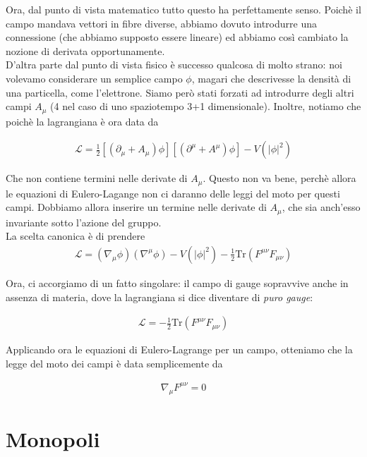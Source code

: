 \documentclass{report}
\begin{document}
Ora, dal punto di vista matematico tutto questo ha perfettamente senso. Poichè il campo mandava vettori in fibre diverse, abbiamo dovuto introdurre una connessione (che abbiamo supposto essere lineare) ed abbiamo così cambiato la nozione di derivata opportunamente. \\

D'altra parte dal punto di vista fisico è successo qualcosa di molto strano: noi volevamo considerare un semplice campo \(\phi\), magari che descrivesse la densità di una particella, come l'elettrone. Siamo però stati forzati ad introdurre degli altri campi \(A_\mu\) (4 nel caso di uno spaziotempo 3+1 dimensionale). Inoltre, notiamo che poichè la lagrangiana è ora data da 

\begin{align}
    \mathcal{L} = \frac{1}{2}[(\partial_\mu + A_\mu)\phi][(\partial^\mu + A^\mu)\phi] - V(|\phi|^2) 
\end{align}

Che non contiene termini nelle derivate di \(A_\mu\). Questo non va bene, perchè allora le equazioni di Eulero-Lagange non ci daranno delle leggi del moto per questi campi. Dobbiamo allora inserire un termine nelle derivate di \(A_\mu\), che sia anch'esso invariante sotto l'azione del gruppo. \\

La scelta canonica è di prendere 
\begin{align}
    \mathcal{L} = (\nabla_\mu \phi)(\nabla^\mu \phi) - V(|\phi|^2) - \frac{1}{2}\text{Tr}(F^{\mu\nu}F_{\mu\nu})
\end{align}

Ora, ci accorgiamo di un fatto singolare: il campo di gauge sopravvive anche in assenza di materia, dove la lagrangiana si dice diventare di \emph{puro gauge}:

\begin{align}
    \mathcal{L} = -\frac{1}{2}\text{Tr}(F^{\mu\nu}F_{\mu\nu})
\end{align}

Applicando ora le equazioni di Eulero-Lagrange per un campo, otteniamo che la legge del moto dei campi è data semplicemente da 

\begin{align}
    \nabla_\mu F^{\mu\nu} = 0
\end{align}

\section{Monopoli}
\end{document}
